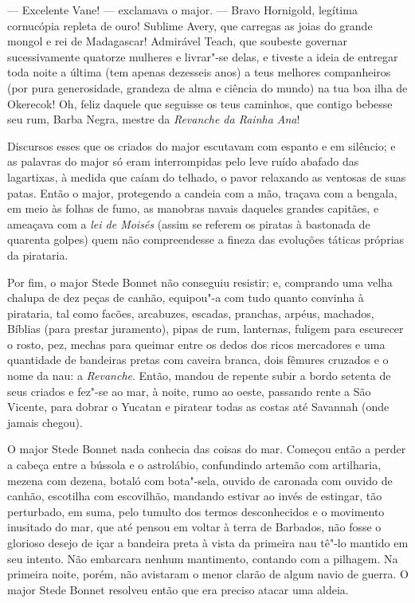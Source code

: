 --- Excelente Vane! --- exclamava o major. --- Bravo Hornigold, legítima cornucópia
repleta de ouro! Sublime Avery, que carregas as joias do grande mongol e
rei de Madagascar! Admirável Teach, que soubeste governar sucessivamente
quatorze mulheres e livrar"-se delas, e tiveste a ideia de entregar toda
noite a última (tem apenas dezesseis anos) a teus melhores companheiros
(por pura generosidade, grandeza de alma e ciência do mundo) na tua boa
ilha de Okerecok! Oh, feliz daquele que seguisse os teus caminhos, que
contigo bebesse seu rum, Barba Negra, mestre da \textit{Revanche da Rainha
Ana}!

Discursos esses que os criados do major escutavam com espanto e em
silêncio; e as palavras do major só eram interrompidas pelo leve ruído
abafado das lagartixas, à medida que caíam do telhado, o pavor relaxando
as ventosas de suas patas. Então o major, protegendo a candeia com a mão,
traçava com a bengala, em meio às folhas de fumo, as manobras navais
daqueles grandes capitães, e ameaçava com a \textit{lei de Moisés} (assim
se referem os piratas à bastonada de quarenta golpes) quem não
compreendesse a fineza das evoluções táticas próprias da pirataria.

Por fim, o major Stede Bonnet não conseguiu resistir; e, comprando uma
velha chalupa de dez peças de canhão, equipou"-a com tudo quanto convinha à
pirataria, tal como facões, arcabuzes, escadas, pranchas, arpéus,
machados, Bíblias (para prestar juramento), pipas de rum, lanternas,
fuligem para escurecer o rosto, pez, mechas para queimar entre os dedos
dos ricos mercadores e uma quantidade de bandeiras pretas com caveira
branca, dois fêmures cruzados e o nome da nau: a \textit{Revanche}. Então,
mandou de repente subir a bordo setenta de seus criados e fez"-se ao mar, à
noite, rumo ao oeste, passando rente a São Vicente, para dobrar o Yucatan
e piratear todas as costas até Savannah (onde jamais chegou).

O major Stede Bonnet nada conhecia das coisas do mar. Começou então a
perder a cabeça entre a bússola e o astrolábio, confundindo artemão com
artilharia, mezena com dezena, botaló com bota"-sela, ouvido de caronada
com ouvido de canhão, escotilha com escovilhão, mandando estivar ao invés
de estingar, tão perturbado, em suma, pelo tumulto dos termos
desconhecidos e o movimento inusitado do mar, que até pensou em voltar à
terra de Barbados, não fosse o glorioso desejo de içar a bandeira preta à
vista da primeira nau tê"-lo mantido em seu intento. Não embarcara nenhum
mantimento, contando com a pilhagem. Na primeira noite, porém, não
avistaram o menor clarão de algum navio de guerra. O major Stede Bonnet
resolveu então que era preciso atacar uma aldeia.

